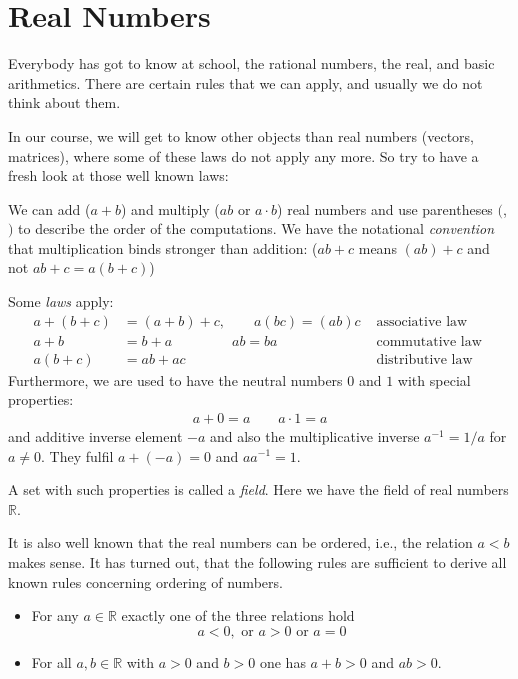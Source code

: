 

\section{Real Numbers}
Everybody has got to know at school, the rational numbers, the real, and basic arithmetics. There are certain rules that 
we can apply, and usually we do not think about them. 

In our course, we will get to know other objects than real numbers (vectors, matrices), where some of these laws do not 
apply any more. So try to have a fresh look at those well known laws:

We can add ($a+b$) and multiply ($ab$ or $a\cdot b$) real numbers and use parentheses $($,$)$ to 
describe the order of the computations. We have the notational \emph{convention}
that multiplication binds stronger than addition: ($ab+c$ means $(ab)+c$ and not $ab+c=a(b+c)$)

Some \emph{laws} apply:
\begin{align*}
 a+(b+c)&=(a+b)+c, \qquad a(bc)=(ab)c  & \mbox{ associative law }\\
 a+b &=b+a \qquad \qquad \;  ab = ba & \mbox{ commutative law }\\
 a(b+c) &= ab+ac  & \mbox{ distributive law }
\end{align*}
Furthermore, we are used to have the neutral numbers $0$ and $1$ with special properties:
\begin{align*}
 a+0 = a \qquad a \cdot 1 = a
\end{align*}
and additive inverse element $-a$ and also the multiplicative inverse $a^{-1}=1/a$
for $a \neq 0$. They fulfil $a+(-a)=0$ and $a a^{-1}=1$. 

A set with such properties is called a \emph{field}. Here we have the field of real numbers $\mathbb{R}$.

It is also well known that the real numbers can be ordered, i.e., the relation $a < b$ makes sense. It has
turned out, that the following rules are sufficient to derive all known rules concerning ordering of numbers. 

\begin{itemize}
 \item For any $a \in \mathbb{R}$ exactly one of the three relations hold
 \[
  a < 0, \mbox{ or } a > 0 \mbox{ or } a = 0   
 \]
 \item For all $a,b\in \mathbb{R}$ with $a>0$ and $b>0$ one has $a+b > 0$ and $a b > 0$.
\end{itemize}

